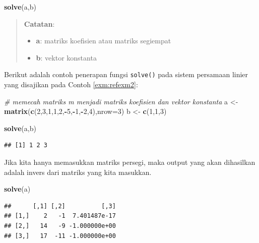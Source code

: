 \documentclass[]{book}
\newenvironment{Shaded}{\begin{snugshade}}{\end{snugshade}}
\newcommand{\CommentTok}[1]{\textcolor[rgb]{0.56,0.35,0.01}{\textit{#1}}}
\newcommand{\DataTypeTok}[1]{\textcolor[rgb]{0.13,0.29,0.53}{#1}}
\newcommand{\DecValTok}[1]{\textcolor[rgb]{0.00,0.00,0.81}{#1}}
\newcommand{\KeywordTok}[1]{\textcolor[rgb]{0.13,0.29,0.53}{\textbf{#1}}}
\newcommand{\NormalTok}[1]{#1}
\newcommand{\OperatorTok}[1]{\textcolor[rgb]{0.81,0.36,0.00}{\textbf{#1}}}
\newcommand{\StringTok}[1]{\textcolor[rgb]{0.31,0.60,0.02}{#1}}
\providecommand{\tightlist}{%
  \setlength{\itemsep}{0pt}\setlength{\parskip}{0pt}}
\theoremstyle{definition}
\theoremstyle{definition}
\theoremstyle{definition}
\theoremstyle{remark}
\begin{document}
\begin{Shaded}
\begin{Highlighting}[]
\KeywordTok{solve}\NormalTok{(a,b)}
\end{Highlighting}
\end{Shaded}

\begin{quote}
\textbf{Catatan}:

\begin{itemize}
\tightlist
\item
  \textbf{a}: matriks koefisien atau matriks segiempat
\item
  \textbf{b}: vektor konstanta
\end{itemize}
\end{quote}

Berikut adalah contoh penerapan fungsi \texttt{solve()} pada sistem persamaan linier yang disajikan pada Contoh \ref{exm:refexm2}:

\begin{Shaded}
\begin{Highlighting}[]
\CommentTok{# memecah matriks m menjadi matriks koefisien dan vektor konstanta}
\NormalTok{a <-}\StringTok{ }\KeywordTok{matrix}\NormalTok{(}\KeywordTok{c}\NormalTok{(}\DecValTok{2}\NormalTok{,}\DecValTok{3}\NormalTok{,}\DecValTok{1}\NormalTok{,}\DecValTok{1}\NormalTok{,}\DecValTok{2}\NormalTok{,}\OperatorTok{-}\DecValTok{5}\NormalTok{,}\OperatorTok{-}\DecValTok{1}\NormalTok{,}\OperatorTok{-}\DecValTok{2}\NormalTok{,}\DecValTok{4}\NormalTok{),}\DataTypeTok{nrow=}\DecValTok{3}\NormalTok{)}
\NormalTok{b <-}\StringTok{ }\KeywordTok{c}\NormalTok{(}\DecValTok{1}\NormalTok{,}\DecValTok{1}\NormalTok{,}\DecValTok{3}\NormalTok{)}

\KeywordTok{solve}\NormalTok{(a,b)}
\end{Highlighting}
\end{Shaded}

\begin{verbatim}
## [1] 1 2 3
\end{verbatim}

Jika kita hanya memasukkan matriks persegi, maka output yang akan dihasilkan adalah invers dari matriks yang kita masukkan.

\begin{Shaded}
\begin{Highlighting}[]
\KeywordTok{solve}\NormalTok{(a)}
\end{Highlighting}
\end{Shaded}

\begin{verbatim}
##      [,1] [,2]          [,3]
## [1,]    2   -1  7.401487e-17
## [2,]   14   -9 -1.000000e+00
## [3,]   17  -11 -1.000000e+00
\end{verbatim}
\end{document}
